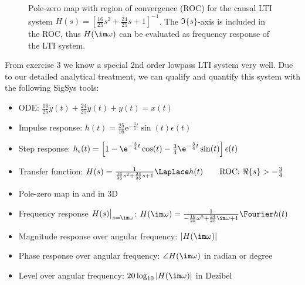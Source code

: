 \begin{figure}
\centering
{}
\caption{Pole-zero map with region of convergence (ROC) for the causal LTI system
$H(s) = \left[\frac{16}{25} s^2 + \frac{24}{25} s + 1\right]^{-1}$.
The $\Im\{s\}$-axis is included in the ROC, thus $H(\im\omega)$ can be evaluated as
frequency response of the LTI system.}
\label{fig:pzmap_44EB4169E9}
\end{figure}



From exercise 3 we know a special 2nd order lowpass LTI system very well.
Due to our detailed analytical treatment, we can qualify and quantify this system
with the following SigSys tools:
\begin{itemize}
  \item ODE: $\frac{16}{25} \ddot{y}(t) + \frac{24}{25} \dot{y}(t) + y(t) = x(t)$
  \item Impulse response: $h(t) = \frac{25}{16} \mathrm{e}^{-\frac{3}{4} t} \sin(t) \epsilon(t)$
  \item Step response: $h_\epsilon(t)=\left[1
  - \e^{-\frac{3}{4} t} \cos(t)
  - \frac{3}{4}\e^{-\frac{3}{4} t} \sin(t) \right]\epsilon(t)$
  \item Transfer function:
  $H(s) = \frac{1}{\frac{16}{25} s^2 + \frac{24}{25} s + 1}\Laplace h(t)
  \qquad\text{ROC: }\Re\{s\}>-\frac{3}{4}$
  \item Pole-zero map in  and in 3D
  \item Frequency response $H(s)\big|_{s=\im\omega}$:
  $H(\im\omega) = \frac{1}{-\frac{16}{25}\omega^2 + \frac{24}{25}\im\omega  + 1}
  \Fourier h(t)$
  \item Magnitude response over angular frequency: $|H(\im\omega)|$
  \item Phase response over angular frequency: $\angle H(\im\omega)$ in radian or degree
  \item Level over angular frequency: $20 \log_{10}|H(\im\omega)|$ in Dezibel
\end{itemize}

